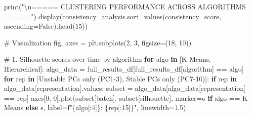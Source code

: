 \documentclass[
  letterpaper,
  DIV=11,
  numbers=noendperiod]{scrartcl}
\newenvironment{Shaded}{\begin{snugshade}}{\end{snugshade}}
\newcommand{\BuiltInTok}[1]{\textcolor[rgb]{0.00,0.23,0.31}{#1}}
\newcommand{\CharTok}[1]{\textcolor[rgb]{0.13,0.47,0.30}{#1}}
\newcommand{\CommentTok}[1]{\textcolor[rgb]{0.37,0.37,0.37}{#1}}
\newcommand{\ControlFlowTok}[1]{\textcolor[rgb]{0.00,0.23,0.31}{\textbf{#1}}}
\newcommand{\DecValTok}[1]{\textcolor[rgb]{0.68,0.00,0.00}{#1}}
\newcommand{\FloatTok}[1]{\textcolor[rgb]{0.68,0.00,0.00}{#1}}
\newcommand{\KeywordTok}[1]{\textcolor[rgb]{0.00,0.23,0.31}{\textbf{#1}}}
\newcommand{\NormalTok}[1]{\textcolor[rgb]{0.00,0.23,0.31}{#1}}
\newcommand{\OperatorTok}[1]{\textcolor[rgb]{0.37,0.37,0.37}{#1}}
\newcommand{\SpecialCharTok}[1]{\textcolor[rgb]{0.37,0.37,0.37}{#1}}
\newcommand{\SpecialStringTok}[1]{\textcolor[rgb]{0.13,0.47,0.30}{#1}}
\newcommand{\StringTok}[1]{\textcolor[rgb]{0.13,0.47,0.30}{#1}}
\newcommand{\VariableTok}[1]{\textcolor[rgb]{0.07,0.07,0.07}{#1}}
\renewenvironment{Shaded}{%
  \begin{tcolorbox}[%
    enhanced,%
    colback=codebg,%
    colframe=codebg,%
    borderline west={3pt}{0pt}{sectionblue},%
    fontupper=\small\ttfamily,%
    boxrule=0pt,%
    arc=0pt,%
    boxsep=5pt,%
    left=2mm,%
    right=2mm,%
    top=2mm,%
    bottom=2mm%
  ]%
}{%
  \end{tcolorbox}%
}
\begin{document}
\begin{Shaded}
\begin{Highlighting}[]
\BuiltInTok{print}\NormalTok{(}\StringTok{"}\CharTok{\textbackslash{}n}\StringTok{===== CLUSTERING PERFORMANCE ACROSS ALGORITHMS ====="}\NormalTok{)}
\NormalTok{display(consistency\_analysis.sort\_values(}\StringTok{\textquotesingle{}consistency\_score\textquotesingle{}}\NormalTok{, ascending}\OperatorTok{=}\VariableTok{False}\NormalTok{).head(}\DecValTok{15}\NormalTok{))}

\CommentTok{\# Visualization}
\NormalTok{fig, axes }\OperatorTok{=}\NormalTok{ plt.subplots(}\DecValTok{2}\NormalTok{, }\DecValTok{3}\NormalTok{, figsize}\OperatorTok{=}\NormalTok{(}\DecValTok{18}\NormalTok{, }\DecValTok{10}\NormalTok{))}

\CommentTok{\# 1. Silhouette scores over time by algorithm}
\ControlFlowTok{for}\NormalTok{ algo }\KeywordTok{in}\NormalTok{ [}\StringTok{\textquotesingle{}K{-}Means\textquotesingle{}}\NormalTok{, }\StringTok{\textquotesingle{}Hierarchical\textquotesingle{}}\NormalTok{]:}
\NormalTok{    algo\_data }\OperatorTok{=}\NormalTok{ full\_results\_df[full\_results\_df[}\StringTok{\textquotesingle{}algorithm\textquotesingle{}}\NormalTok{] }\OperatorTok{==}\NormalTok{ algo]}
    \ControlFlowTok{for}\NormalTok{ rep }\KeywordTok{in}\NormalTok{ [}\StringTok{\textquotesingle{}Unstable PCs only (PC1{-}3)\textquotesingle{}}\NormalTok{, }\StringTok{\textquotesingle{}Stable PCs only (PC7{-}10)\textquotesingle{}}\NormalTok{]:}
        \ControlFlowTok{if}\NormalTok{ rep }\KeywordTok{in}\NormalTok{ algo\_data[}\StringTok{\textquotesingle{}representation\textquotesingle{}}\NormalTok{].values:}
\NormalTok{            subset }\OperatorTok{=}\NormalTok{ algo\_data[algo\_data[}\StringTok{\textquotesingle{}representation\textquotesingle{}}\NormalTok{] }\OperatorTok{==}\NormalTok{ rep]}
\NormalTok{            axes[}\DecValTok{0}\NormalTok{, }\DecValTok{0}\NormalTok{].plot(subset[}\StringTok{\textquotesingle{}batch\textquotesingle{}}\NormalTok{], subset[}\StringTok{\textquotesingle{}silhouette\textquotesingle{}}\NormalTok{], }
\NormalTok{                          marker}\OperatorTok{=}\StringTok{\textquotesingle{}o\textquotesingle{}} \ControlFlowTok{if}\NormalTok{ algo }\OperatorTok{==} \StringTok{\textquotesingle{}K{-}Means\textquotesingle{}} \ControlFlowTok{else} \StringTok{\textquotesingle{}s\textquotesingle{}}\NormalTok{,}
\NormalTok{                          label}\OperatorTok{=}\SpecialStringTok{f"}\SpecialCharTok{\{}\NormalTok{algo[:}\DecValTok{4}\NormalTok{]}\SpecialCharTok{\}}\SpecialStringTok{: }\SpecialCharTok{\{}\NormalTok{rep[:}\DecValTok{15}\NormalTok{]}\SpecialCharTok{\}}\SpecialStringTok{"}\NormalTok{, linewidth}\OperatorTok{=}\FloatTok{1.5}\NormalTok{)}


\end{Highlighting}
\end{Shaded}
\end{document}
